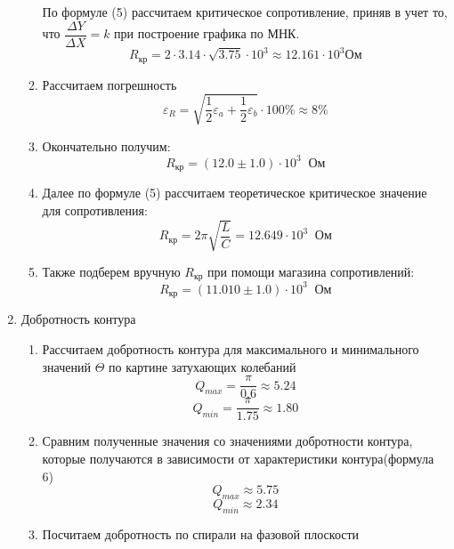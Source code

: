 \documentclass[a4paper,12pt]{article}
\begin{document}
\begin{enumerate}
\begin{enumerate}
По формуле (5) рассчитаем критическое сопротивление, приняв в учет то, что $\dfrac{\Delta Y}{\Delta X}=k$ при построение графика по МНК.
\begin{equation*}
R_{\text{кр}} = 2 \cdot 3.14 \cdot \sqrt{3.75} \cdot 10^3 \approx 12.161 \cdot 10^3 \text{Ом}
\end{equation*}
\item Рассчитаем погрешность  
\begin{equation*}
\varepsilon_{R} = \sqrt{\dfrac{1}{2}\varepsilon_{a} + \dfrac{1}{2}\varepsilon_{b}} \cdot 100\% \approx 8\%
\end{equation*}
\item Окончательно получим:
\begin{equation*}
R_{\text{кр}} =(12.0 \pm 1.0) \cdot 10^3 \;\; \text{Ом}
\end{equation*}
\item Далее по формуле (5) рассчитаем теоретическое критическое значение для сопротивления:
\begin{equation*}
R_{\text{кр}} = 2\pi\sqrt{\dfrac{L}{C}} = 12.649 \cdot 10^3 \;\; \text{Ом}
\end{equation*}
\item Также подберем вручную $R_{\text{кр}}$ при помощи магазина сопротивлений:
\begin{equation*}
R_{\text{кр}} =(11.010 \pm 1.0) \cdot 10^3 \;\; \text{Ом}
\end{equation*}
\end{enumerate}
\item Добротность контура
\begin{enumerate}
\itemsep0em
\item Рассчитаем добротность контура для максимального и минимального значений $\Theta$ по картине затухающих колебаний
\begin{equation*}
Q_{max} = \dfrac{\pi}{0.6} \approx 5.24
\end{equation*}
\begin{equation*}
Q_{min} = \dfrac{\pi}{1.75} \approx 1.80
\end{equation*}
\item Сравним полученные значения со значениями добротности контура, которые получаются в зависимости от характеристики контура(формула 6)
\begin{equation*}
Q_{max} \approx 5.75
\end{equation*}
\begin{equation*}
Q_{min} \approx 2.34
\end{equation*}
\item Посчитаем добротность по спирали на фазовой плоскости


\end{enumerate}
\end{enumerate}
\end{document}
